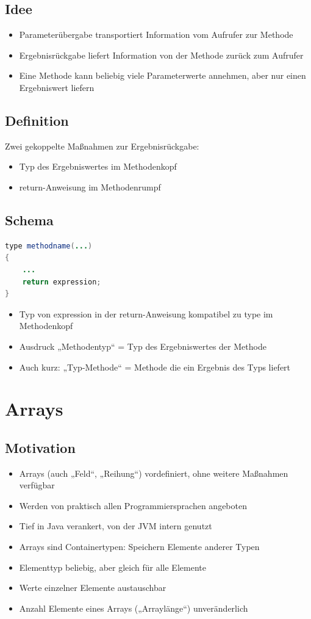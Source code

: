 \subsection{Idee}
\begin{itemize}
\item Parameterübergabe transportiert Information vom Aufrufer zur Methode
\item Ergebnisrückgabe liefert Information von der Methode zurück zum Aufrufer
\item Eine Methode kann beliebig viele Parameterwerte annehmen, aber nur einen Ergebniswert liefern
\end{itemize}

\subsection{Definition}
Zwei gekoppelte Maßnahmen zur Ergebnisrückgabe:
\begin{itemize}
\item Typ des Ergebniswertes im Methodenkopf
\item return-Anweisung im Methodenrumpf
\end{itemize}

\subsection{Schema}
 \begin{lstlisting}[language=JAVA]
type methodname(...)
{
	...
	return expression;
}
 \end{lstlisting}
\begin{itemize}
\item Typ von expression in der return-Anweisung kompatibel zu type im Methodenkopf
\item Ausdruck „Methodentyp“ = Typ des Ergebniswertes der Methode
\item Auch kurz: „Typ-Methode“ = Methode die ein Ergebnis des Typs liefert
\end{itemize}
%
%
%
\section{Arrays}
\subsection{Motivation}
\begin{itemize}
\item Arrays (auch „Feld“, „Reihung“) vordefiniert, ohne weitere Maßnahmen verfügbar
\item Werden von praktisch allen Programmiersprachen angeboten
\item Tief in Java verankert, von der JVM intern genutzt
\item Arrays sind Containertypen: Speichern Elemente anderer Typen
\item Elementtyp beliebig, aber gleich für alle Elemente
\item Werte einzelner Elemente austauschbar
\item Anzahl Elemente eines Arrays („Arraylänge“) unveränderlich
\end{itemize}

